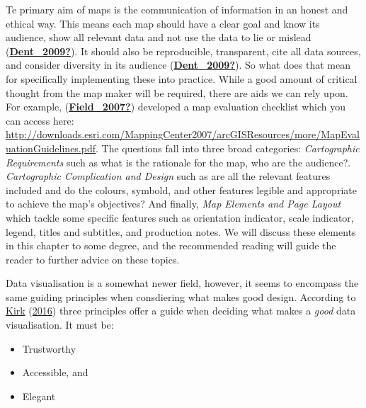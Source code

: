\documentclass[
]{book}
\providecommand{\tightlist}{%
  \setlength{\itemsep}{0pt}\setlength{\parskip}{0pt}}
\begin{document}
Te primary aim of maps is the communication of information in an honest and ethical way. This means each map should have a clear goal and know its audience, show all relevant data and not use the data to lie or mislead (\protect\hyperlink{ref-Dent_2009}{\textbf{Dent\_2009?}}). It should also be reproducible, transparent, cite all data sources, and consider diversity in its audience (\protect\hyperlink{ref-Dent_2009}{\textbf{Dent\_2009?}}). So what does that mean for specifically implementing these into practice. While a good amount of critical thought from the map maker will be required, there are aids we can rely upon. For example, (\protect\hyperlink{ref-Field_2007}{\textbf{Field\_2007?}}) developed a map evaluation checklist which you can access here: \url{http://downloads.esri.com/MappingCenter2007/arcGISResources/more/MapEvaluationGuidelines.pdf}. The questions fall into three broad categories: \emph{Cartographic Requirements} such as what is the rationale for the map, who are the audience?. \emph{Cartographic Complication and Design} such as are all the relevant features included and do the colours, symbold, and other features legible and appropriate to achieve the map's objectives? And finally, \emph{Map Elements and Page Layout} which tackle some specific features such as orientation indicator, scale indicator, legend, titles and subtitles, and production notes. We will discuss these elements in this chapter to some degree, and the recommended reading will guide the reader to further advice on these topics.

Data visualisation is a somewhat newer field, however, it seems to encompass the same guiding principles when consdiering what makes good design. According to \protect\hyperlink{ref-Kirk_2016}{Kirk} (\protect\hyperlink{ref-Kirk_2016}{2016}) three principles offer a guide when deciding what makes a \emph{good} data visualisation. It must be:

\begin{itemize}
\tightlist
\item
  Trustworthy
\item
  Accessible, and
\item
  Elegant
\end{itemize}
\end{document}
